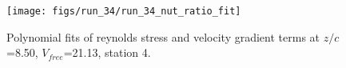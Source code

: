 \begin{figure}[H]
\centering
\texttt{[image: figs/run\_34/run\_34\_nut\_ratio\_fit]}
\caption{Polynomial fits of reynolds stress and velocity gradient terms at $z/c$=8.50, $V_{free}$=21.13, station 4.}
\label{fig:run_34_nut_ratio_fit}
\end{figure}


